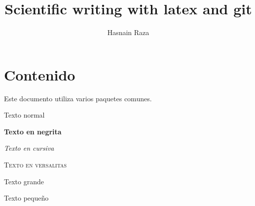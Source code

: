 \documentclass[12pt,a4paper]{article}
\title{Scientific writing with latex and git}
\author{Hasnain Raza}
\begin{document}
	
	\maketitle
	
	\section{Contenido}
	Este documento utiliza varios paquetes comunes.
	
	
	
	Texto normal
	
	\textbf{Texto en negrita}
	
	\textit{Texto en cursiva}
	
	\textsc{Texto en versalitas}
	
	{\Large Texto grande}
	
	{\footnotesize Texto pequeño}
	
	
\end{document}
